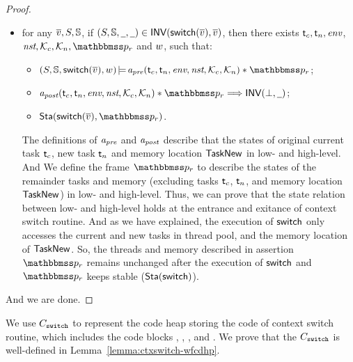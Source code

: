 \begin{proof}
\begin{itemize}
        \item for any $\overline{v}, S, \mathbb{S}$, 
        if $(S, \mathbb{S}, \underline{\ \,}, \underline{\ \,}) \in 
            \textsf{INV}{(\mathsf{switch}(\overline{v}), \overline{v})}$, 
        then there exists $\textsf{t}_c, \textsf{t}_n, \textit{env}$, $\nst, 
        \hthrdlocalst_c, \hthrdlocalst_n, \relastP_r$ and $w$, 
        such that:
        \begin{itemize}
            \small
            \item $\asrtmodel{(\state, \hpstate, \primsw(\args{\val}), \word)}
                {\Apre(\thrdid_c, \thrdid_n, \env, \nst, \hthrdlocalst_c, 
                \hthrdlocalst_n) \sepstar \relastP_r}$; 
            \item  $\Apost(\thrdid_c, \thrdid_n, \env, \nst, \hthrdlocalst_c, 
                \hthrdlocalst_n) \sepstar \relastP_r \Longrightarrow 
                \INV{(\primdone, \notCare)}$; 
            \item $\Sta(\primsw(\args{\val}), \relastP_r)$. 
        \end{itemize}

        The definitions of $\textit{a}_\textit{pre}$ and $\textit{a}_\textit{post}$ describe that 
        the states of original current task $\textsf{t}_c$,  
        new task $\textsf{t}_n$ and memory location $\mathsf{TaskNew}$ 
        in low- and high-level. 
        And We define the frame 
        $\relastP_r$ to describe the states of the 
        remainder tasks and memory 
        (excluding tasks $\textsf{t}_c$, $\textsf{t}_n$, and 
        memory location $\mathsf{TaskNew}$) in low- and high-level.
        Thus, we can prove that the 
        state relation between low- and high-level 
        holds at the entrance and 
        exitance of context switch routine. 
        And as we have explained, the execution of 
        $\mathsf{switch}$ only accesses 
        the current and new tasks in thread pool, and the 
        memory location of $\mathsf{TaskNew}$. So, 
        the threads and memory described in assertion 
        $\relastP_r$ remains unchanged after the 
        execution of $\mathsf{switch}$ and $\relastP_r$ keeps 
        stable ($\textsf{Sta}(\mathsf{switch})$).
    \end{itemize}
    And we are done. 
\end{proof}

We use $C_{\texttt{switch}}$ to represent the 
code heap storing the code of context switch routine, 
which includes the code blocks \SwitchEntry{}, 
\regsave{}, \regrestore{}, 
\SaveUsedWin{} and \SwitchNewTask{}. We prove that 
the $C_{\texttt{switch}}$ is well-defined in 
Lemma~\ref{lemma:ctxswitch-wfcdhp}.

